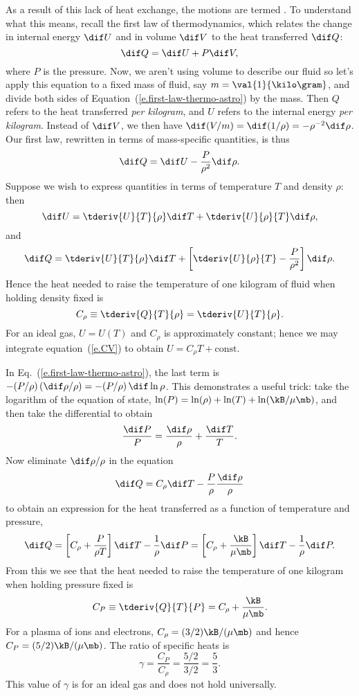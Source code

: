 As a result of this lack of heat exchange, the motions are termed .  To understand what this means, recall the first law of thermodynamics\cite{Fermi1956Thermodynamics}, which relates the change in internal energy $\dif U$ and in volume $\dif V$ to the heat transferred $\dif Q$:
\begin{equation}\label{e.first-law-thermo}
	\dif Q = \dif U + P\dif V,
\end{equation}
where $P$ is the pressure. Now, we aren't using volume to describe our fluid so let's apply this equation to a fixed mass of fluid, say $m = \val{1}{\kilo\gram}$, and divide both sides of Equation~(\ref{e.first-law-thermo-astro}) by the mass. Then $Q$ refers to the heat transferred \emph{per kilogram}, and $U$ refers to the internal energy \emph{per kilogram}.  Instead of $\dif V$, we then have $\dif(V/m) = \dif(1/\rho) = -\rho^{-2}\dif\rho$.  Our first law, rewritten in terms of mass-specific quantities, is thus
\begin{equation}\label{e.first-law-thermo-astro}
	\dif Q = \dif U -\frac{P}{\rho^{2}}\dif \rho.
\end{equation}
Suppose we wish to express quantities in terms of temperature $T$ and density $\rho$: then
\[ \dif U = \tderiv{U}{T}{\rho}\dif T + \tderiv{U}{\rho}{T}\dif \rho, \]
and
\[ \dif Q = \tderiv{U}{T}{\rho}\dif T + \left[\tderiv{U}{\rho}{T} - \frac{P}{\rho^{2}}\right]\dif \rho. \]
Hence the heat needed to raise the temperature of one kilogram of fluid when holding density fixed is
\begin{equation}\label{e.CV}
C_{\rho} \equiv \tderiv{Q}{T}{\rho} = \tderiv{U}{T}{\rho}.
\end{equation}
For an ideal gas, $U = U(T)$ and $C_{\rho}$ is approximately constant; hence we may integrate equation~(\ref{e.CV}) to obtain $U = C_{\rho}T + \textrm{const}$.

In Eq.~(\ref{e.first-law-thermo-astro}), the last term is $-(P/\rho)\, (\dif\rho/\rho) = -(P/\rho)\,\dif\ln\rho$. This demonstrates a useful trick: take the logarithm of the equation of state, $\ln (P) = \ln(\rho) + \ln (T) + \ln (\kB/\mu\mb)$, and then take the differential to obtain
\[ \frac{\dif P}{P} = \frac{\dif\rho}{\rho} + \frac{\dif T}{T}. \]
Now eliminate $\dif\rho/\rho$ in the equation
\[ \dif Q = C_{\rho}\dif T - \frac{P}{\rho}\frac{\dif\rho}{\rho} \]
to obtain an expression for the heat transferred as a function of temperature and pressure,
\[ \dif Q = \left[C_{\rho} + \frac{P}{\rho T}\right]\dif T - \frac{1}{\rho}\dif P
	 = \left[C_{\rho} + \frac{\kB}{\mu\mb}\right]\dif T - \frac{1}{\rho}\dif P. \]
From this we see that the heat needed to raise the temperature of one kilogram when holding pressure fixed is
\begin{equation}\label{e.CP}
C_{P}\equiv \tderiv{Q}{T}{P} = C_{\rho} + \frac{\kB}{\mu\mb}.
\end{equation}
For a plasma of ions and electrons, $C_\rho = (3/2)\kB/(\mu\mb)$ and hence $C_P = (5/2)\kB/(\mu\mb)$.  The ratio of specific heats is
\begin{equation}\label{e.gamma}
    \gamma = \frac{C_P}{C_\rho} = \frac{5/2}{3/2} = \frac{5}{3}.
\end{equation}
This value of $\gamma$ is for an ideal gas and does not hold universally.

